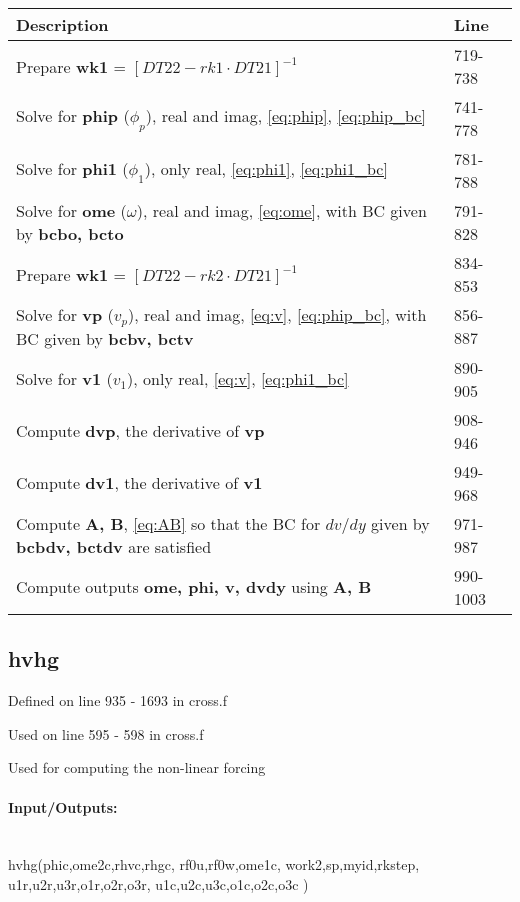 \documentclass[titlepage,12pt,letter]{article}
\newcommand{\bracket}[1]{\left[ #1 \right]}
\numberwithin{equation}{section}
\begin{document}
\begin{table}[H]
	\centering 
	\renewcommand{\arraystretch}{1.5} 
	\begin{tabular}{l|l}
		Description& Line \\ \hline
		Prepare \textbf{wk1} = $\bracket{DT22 - rk1 \cdot DT21}^{-1}$ &719-738\\
		Solve for \textbf{phip} ($\phi_p$), real and imag, \eqref{eq:phip}, \eqref{eq:phip_bc}&741-778\\
		Solve for \textbf{phi1} ($\phi_1$), only real, \eqref{eq:phi1}, \eqref{eq:phi1_bc}&781-788\\
		Solve for \textbf{ome}  ($\omega$), real and imag, \eqref{eq:ome}, with BC given by \textbf{bcbo, bcto}&791-828\\
		\hdashline
		Prepare \textbf{wk1} = $\bracket{DT22 - rk2 \cdot DT21}^{-1}$ &834-853\\
		Solve for \textbf{vp} ($v_p$), real and imag, \eqref{eq:v}, \eqref{eq:phip_bc}, with BC given by \textbf{bcbv, bctv}&856-887\\
		Solve for \textbf{v1} ($v_1$), only real, \eqref{eq:v}, \eqref{eq:phi1_bc}&890-905\\
		\hdashline
		Compute \textbf{dvp}, the derivative of \textbf{vp}&908-946\\
		Compute \textbf{dv1}, the derivative of \textbf{v1}&949-968\\
		\hdashline
		Compute \textbf{A, B}, \eqref{eq:AB} so that the BC for $dv/dy$ given by \textbf{bcbdv, bctdv} are satisfied&971-987\\
		\hdashline
		Compute outputs \textbf{ome, phi, v, dvdy} using \textbf{A, B}&990-1003\\ \hline
	\end{tabular} 
\end{table}


\subsection{hvhg}
Defined on line 935 - 1693 in cross.f

Used on line 595 - 598 in cross.f

Used for computing the non-linear forcing 

\paragraph{Input/Outputs:}\phantom{a}\\
hvhg(phic,ome2c,rhvc,rhgc, rf0u,rf0w,ome1c, work2,sp,myid,rkstep, \\\phantom{hvhg} u1r,u2r,u3r,o1r,o2r,o3r, u1c,u2c,u3c,o1c,o2c,o3c )
\end{document}
